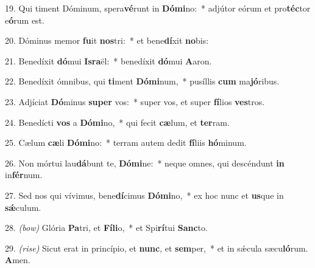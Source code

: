 19. Qui timent Dóminum, spera\textbf{vé}runt in \textbf{Dó}\textbf{mi}no:~* 
	adjútor eórum et pro\textbf{téc}tor e\textbf{ó}rum est.

20. Dóminus memor \textbf{fu}it \textbf{nos}tri:~* 
	et bene\textbf{dí}xit \textbf{no}bis:

21. Benedíxit \textbf{dó}mui \textbf{Is}\textbf{ra}ël:~* 
	benedíxit \textbf{dó}mui \textbf{A}aron.

22. Benedíxit ómnibus, qui \textbf{ti}ment \textbf{Dó}\textbf{mi}num,~* 
	pusíllis \textbf{cum} ma\textbf{jó}ribus.

23. Adjíciat \textbf{Dó}minus \textbf{su}\textbf{per} vos:~* 
	super vos, et super \textbf{fí}lios \textbf{ves}tros.

24. Benedícti \textbf{vos} a \textbf{Dó}\textbf{mi}no,~* 
	qui fecit \textbf{cæ}lum, et \textbf{ter}ram.

25. Cælum \textbf{cæ}li \textbf{Dó}\textbf{mi}no:~* 
	terram autem dedit \textbf{fí}liis \textbf{hó}minum.

26. Non mórtui lau\textbf{dá}bunt te, \textbf{Dó}\textbf{mi}ne:~* 
	neque omnes, qui descéndunt \textbf{in} in\textbf{fér}num.

27. Sed nos qui vívimus, bene\textbf{dí}cimus \textbf{Dó}\textbf{mi}no,~* 
	ex hoc nunc et \textbf{us}que in \textbf{s\'{\ae}}culum.

28. {\color{red}\textit{(bow)}} Glória \textbf{Pa}tri, et \textbf{Fí}\textbf{li}o,~* 
	et Spi\textbf{rí}tui \textbf{Sanc}to.

29. {\color{red}\textit{(rise)}} Sicut erat in princípio, et \textbf{nunc}, et \textbf{sem}per,~* 
	et in s\'{\ae}cula sæcu\textbf{ló}rum. \textbf{A}men.

